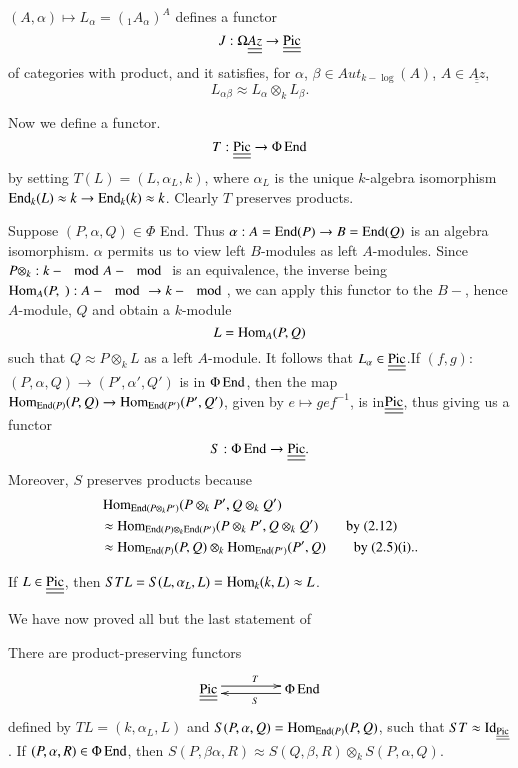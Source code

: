 \setcounter{prop}{3}
\begin{prop}%
$( A, \alpha ) \mapsto L_\alpha = (_1 A_\alpha )^A $ defines a
  functor  
$$
J : \Omega \underline{\underline{Az}} \to \underline{\underline{\operatorname{Pic}}} 
$$ 
of categories with product, and it satisfies, for $\alpha$, $\beta \in
Aut_{k - \log} (A)$, $A \in \underline{\underline{Az}}$, 
$$
L_{\alpha \beta} \approx L_\alpha \otimes_k L_\beta. 
$$

Now we define a functor. 
$$
T : \underline{\underline{\operatorname{Pic}}} \to \Phi \operatorname{End}  
$$
by setting $T(L) = (L, \alpha _L, k)$, where $\alpha_L$ is the unique
$k$-algebra isomorphism $\operatorname{End}_k (L) \approx k \to \operatorname{End}_k (k)\approx
k$. Clearly $T$ preserves products.  

Suppose $(P, \alpha, Q) \in \Phi$ End. Thus $\alpha : A = \operatorname{End} (P) 
\to B = \operatorname{End} (Q)$ is an algebra isomorphism. $\alpha$ permits us to
view left $B$-modules as left $A$-modules. Since $P \otimes_k : k -
\mod A- \mod$ is an equivalence, the inverse being $\operatorname{Hom}_A (P, ~): 
A - \mod \to k - \mod$, we can apply this functor to the $B-$, hence
$A$-module, $Q$ and obtain a $k$-module  
$$
L = \operatorname{Hom}_A (P, Q)
$$
such that $Q \approx P \otimes_k L$ as a left $A$-module. It follows
that $L_\alpha \in \underline{\underline{\operatorname{Pic}}}$.\break If $(f, g)$: $(P,
\alpha, Q) \to (P', \alpha', Q')$ is in $\Phi \operatorname{End}$, then the map $\Hom
_{\End (P)}\break (P, Q) \to \Hom_{\End (P')}(P', Q')$, given by $e \mapsto
ge f^{-1}$, is in\pageoriginale $\underline{\underline{\operatorname{Pic}}}$, thus
giving us a functor  
$$
S  : \Phi \operatorname{End} \to \underline{\underline{\operatorname{Pic}}}. 
$$
Moreover, $S$ preserves products because 
\begin{align*}
& \Hom_{\End (P \otimes_k P')}(P \otimes_k P', Q \otimes_k Q' ) \\ 
& \approx \Hom_{\End (P) \otimes_k \End (P')}(P \otimes_k P', Q
  \otimes_k Q' ) \tag*{{\text by (2.12)}}\\ 
& \approx \Hom_{\End (P)} (P,Q) \otimes_k \Hom_{\End (P')} (P',Q)
\tag*{\text{by (2.5)(i).}}
.\end{align*} 

If $L \in \underline{\underline{\operatorname{Pic}}}$, then $STL = S(L, \alpha _L, L)
= \operatorname{Hom}_k (k, L) \approx L$.  
 \end{prop}
 
We have now proved all but the last statement of 

\begin{prop}%
There are product-preserving functors 
\[
\xymatrix@C=1.5cm{
\underline{\underline{\Pic}} 
 \ar@<0.6ex>[r]^T
& \Phi \End \ar@<0.6ex>[l]^S 
}
\]
defined by $T L = (k, \alpha_L, L)$ and $S(P, \alpha, Q) = \operatorname{Hom}_{\operatorname{End}
  (P)} (P, Q)$, such that $ST \approx
\operatorname{Id}_{\underline{\underline{\operatorname{Pic}}}}$. If $(P, \alpha, R) \in \Phi \operatorname{End}$,
then $S(P, \beta \alpha, R) \approx S (Q, \beta, R) \otimes_k S(P,
\alpha, Q)$.   
\end{prop}

